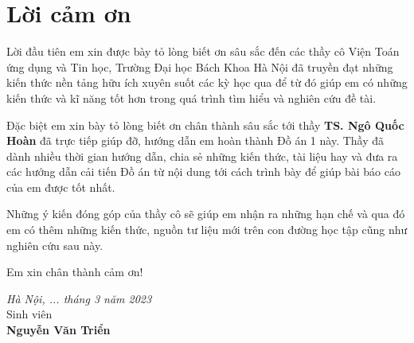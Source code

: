\newpage
{}
\chapter*{Lời cảm ơn}
    Lời đầu tiên em xin được bày tỏ lòng biết ơn sâu sắc đến các thầy cô Viện Toán ứng dụng và Tin học, Trường Đại học Bách Khoa Hà Nội đã truyền đạt những kiến thức nền tảng hữu ích xuyên suốt các kỳ học qua để từ đó giúp em có những kiến thức và kĩ năng tốt hơn trong quá trình tìm hiểu và nghiên cứu đề tài.
    
    Đặc biệt em xin bày tỏ lòng biết ơn chân thành sâu sắc tới thầy \textbf{TS. Ngô Quốc Hoàn} đã trực tiếp giúp đỡ, hướng dẫn em hoàn thành Đồ án 1 này. Thầy đã dành nhiều thời gian hướng dẫn, chia sẻ những kiến thức, tài liệu hay và đưa ra các hướng dẫn cải tiến Đồ án từ nội dung tới cách trình bày để giúp bài báo cáo của em được tốt nhất.
    
    Những ý kiến đóng góp của thầy cô sẽ giúp em nhận ra những hạn chế và qua đó em có thêm những kiến thức, nguồn tư liệu mới trên con đường học tập cũng như nghiên cứu sau này.
    
    Em xin chân thành cảm ơn!
    
\vspace{.5cm}
\hspace{0.5\textwidth}
\begin{minipage}{0.5\textwidth}
	\noindent\begin{center}
		\textit{Hà Nội, ... tháng 3 năm 2023} \\
		Sinh viên\\ \vspace{1.4cm}
		\textbf{Nguyễn Văn Triển} \\
	\end{center}	
\end{minipage}
\newpage